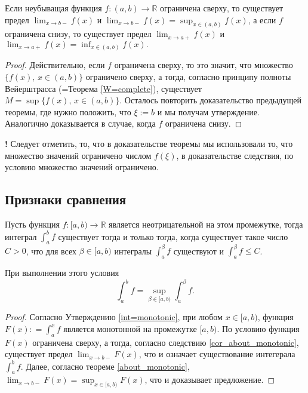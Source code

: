\begin{corollary}\label{cor_about_monotonic}
Если неубыващая функция $f:(a,b) \to \mathbb{R}$ ограничена сверху, то существует предел $\lim_{x\to b-}f(x)$ и $\lim_{x \to b-}f(x) = \sup_{x\in (a,b)}f(x)$, а если $f$ ограничена снизу, то существует предел $\lim_{x\to a+}f(x)$ и $\lim_{x\to a+}f(x) = \inf_{x\in (a,b)} f(x).$
\end{corollary}

\begin{proof}
    Действительно, если $f$ ограничена сверху, то это значит, что множество $\{f(x),\, x\in (a,b)\}$ ограничено сверху, а тогда, согласно принципу полноты Вейерштрасса (=Теорема \ref{W=complete}), существует $M=\sup \{f(x),\, x\in (a,b)\}$. Осталось повторить доказательство предыдущей теоремы, где нужно положить, что $\xi:= b$ и мы получам утверждение. Аналогично доказывается в случае, когда $f$ ограничена снизу.
\end{proof}

\begin{mydanger}{\bf !}
    Следует отметить, то, что в доказательстве теоремы мы использовали то, что множество значений ограничено числом $f(\xi)$, в доказательстве следствия, по условию множество значений ограничено.
\end{mydanger}


\subsection{Признаки сравнения}

\begin{theorem}\label{criteria_for_non-negative_on_non-compact}
    Пусть функция $f:[a,b) \to \mathbb{R}$ является неотрицательной на этом промежутке, тогда интеграл $\int_a^b f$ существует тогда и только тогда, когда существует такое число $C>0$, что для всех $ \beta \in [a ,b)$ интегралы $\int_a^\beta f$ существуют и $\int_a^\beta f \le C$.
    
    При выполнении этого условия
    \[
     \int_a^b f = \sup_{\beta \in [a,b)} \int_a^\beta f.
    \]
\end{theorem}

\begin{proof}
    Согласно Утверждению \ref{int=monotonic}, при любом $x\in [a,b)$, функция $F(x) : = \int_a^x f$ является монотонной на промежутке $[a,b)$. По условию функция $F(x)$ ограничена сверху, а тогда, согласно следствию \ref{cor_about_monotonic}, существует предел $\lim_{x \to b-}F(x)$, что и означает существование интегерала $\int_a^b f.$ Далее, согласно теореме \ref{about_monotonic}, $\lim_{x \to b-}F(x) = \sup_{x\in [a,b)} F(x)$, что и доказывает предложение.
\end{proof}

